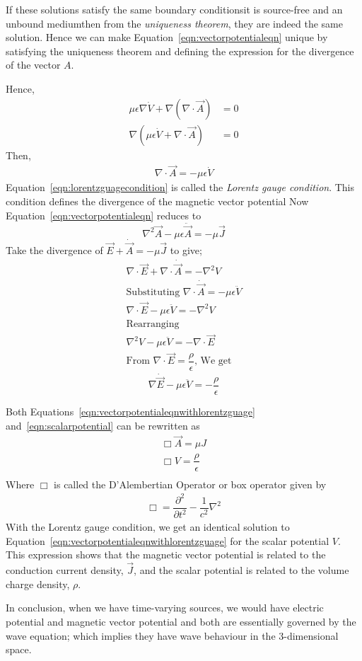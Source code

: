 If these solutions satisfy the same boundary conditions\textemdash it is source-free and an unbound medium\textemdash then from the \emph{uniqueness theorem}, they are indeed the same solution. Hence we can make Equation~\eqref{eqn:vectorpotentialeqn} unique by satisfying the uniqueness theorem and defining the expression for the divergence of the vector $A$.

Hence,
\begin{align*}
\mu\epsilon\nabla\dot{V}+\nabla(\nabla\cdot\vec{A})&=0\\
\nabla(\mu\epsilon\dot{V}+\nabla\cdot\vec{A})&=0
\end{align*}
Then,
\begin{align}
\nabla\cdot\vec{A}=-\mu\epsilon\dot{V}
\label{eqn:lorentzguagecondition}
\end{align}
Equation~\eqref{eqn:lorentzguagecondition} is called the \emph{Lorentz gauge condition}. This condition defines the divergence of the magnetic vector potential
Now Equation~\eqref{eqn:vectorpotentialeqn} reduces to
\begin{equation}
\nabla^{2}\vec{A}-\mu\epsilon\ddot{\vec{A}}=-\mu\vec{J}
\label{eqn:vectorpotentialeqnwithlorentzguage}
\end{equation} 
Take the divergence of $\vec{E}+\dot{\vec{A}}=-\mu\vec{J}$ to give;
\begin{align*}
&\nabla\cdot\vec{E}+\nabla\cdot\dot{\vec{A}}=-\nabla^{2} V&\\
&\text{Substituting $\nabla\cdotp\dot{\vec{A}}=-\mu\epsilon\ddot{V}$}&\\
&\nabla\cdotp\vec{E}-\mu\epsilon\ddot{V}=-\nabla^{2} V&\\
&\text{Rearranging}&\\
&\nabla^{2} V-\mu\epsilon\ddot{V}=-\nabla\cdotp\vec{E}&\\
&\text{From $\nabla\cdotp\vec{E}=\dfrac{\rho}{\epsilon}$, We get}&
\end{align*}
\begin{equation}
\nabla\dot\vec{E}-\mu\epsilon\ddot{V}=-\dfrac{\rho}{\epsilon}
\label{eqn:scalarpotential}
\end{equation}

Both Equations~\eqref{eqn:vectorpotentialeqnwithlorentzguage} and~\eqref{eqn:scalarpotential} can be rewritten as
\begin{align*}
\Box\vec{A}=\mu J\\
\Box V=\dfrac{\rho}{\epsilon}\\
\end{align*}
Where $\Box$ is called the D'Alembertian Operator or box operator given by 
\begin{align*}
\Box=\dfrac{\partial^{2}}{\partial t^{2}}-\dfrac{1}{c^{2}}\nabla^{2}
\end{align*}
With the Lorentz gauge condition, we get an identical solution to Equation~\eqref{eqn:vectorpotentialeqnwithlorentzguage} for the scalar potential $V$. This expression shows that the magnetic vector potential is related to the conduction current density, $\vec{J}$, and the scalar potential is related to the volume charge density, $\rho$.

In conclusion, when we have time-varying sources, we would have electric potential and magnetic vector potential and both are essentially governed by the wave equation; which implies they have wave behaviour in the 3-dimensional space.
